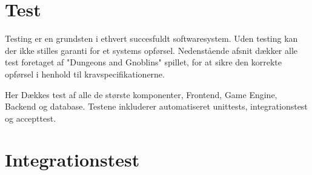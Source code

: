 \section{Test}
Testing er en grundsten i ethvert succesfuldt softwaresystem. Uden testing kan
der ikke stilles garanti for et systems opførsel. Nedenstående afsnit dækker
alle test foretaget af "Dungeons and Gnoblins" spillet, for at sikre den korrekte
opførsel i henhold til kravspecifikationerne.

Her Dækkes test af alle de største komponenter, Frontend, Game Engine, Backend og
database. Testene inkluderer automatiseret unittests, integrationstest og accepttest.





\section{Integrationstest}



